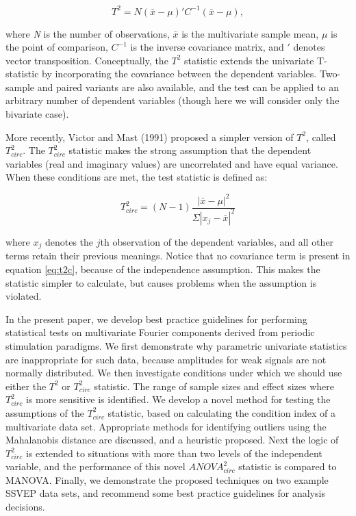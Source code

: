 \documentclass[]{article}
\begin{document}
\begin{equation}
\label{eq:t2eq}
T^2 = N(\bar{x} - \mu)' C^{-1} (\bar{x} - \mu),
\end{equation}

where \emph{N} is the number of observations, \(\bar{x}\) is the multivariate sample mean, \(\mu\) is the point of comparison, \(C^{-1}\) is the inverse covariance matrix, and \('\) denotes vector transposition. Conceptually, the \(T^2\) statistic extends the univariate T-statistic by incorporating the covariance between the dependent variables. Two-sample and paired variants are also available, and the test can be applied to an arbitrary number of dependent variables (though here we will consider only the bivariate case).

More recently, Victor and Mast (1991) proposed a simpler version of \(T^2\), called \(T^2_{circ}\). The \(T^2_{circ}\) statistic makes the strong assumption that the dependent variables (real and imaginary values) are uncorrelated and have equal variance. When these conditions are met, the test statistic is defined as:

\begin{equation}
\label{eq:t2c}
T^2_{circ} = (N-1)\frac{|\bar{x}-\mu|^2}{\Sigma|x_j - \bar{x}|^2}
\end{equation}

where \(x_j\) denotes the \(j\)th observation of the dependent variables, and all other terms retain their previous meanings. Notice that no covariance term is present in equation \eqref{eq:t2c}, because of the independence assumption. This makes the statistic simpler to calculate, but causes problems when the assumption is violated.

In the present paper, we develop best practice guidelines for performing statistical tests on multivariate Fourier components derived from periodic stimulation paradigms. We first demonstrate why parametric univariate statistics are inappropriate for such data, because amplitudes for weak signals are not normally distributed. We then investigate conditions under which we should use either the \(T^2\) or \(T^2_{circ}\) statistic. The range of sample sizes and effect sizes where \(T^2_{circ}\) is more sensitive is identified. We develop a novel method for testing the assumptions of the \(T^2_{circ}\) statistic, based on calculating the condition index of a multivariate data set. Appropriate methods for identifying outliers using the Mahalanobis distance are discussed, and a heuristic proposed. Next the logic of \(T^2_{circ}\) is extended to situations with more than two levels of the independent variable, and the performance of this novel \(ANOVA^2_{circ}\) statistic is compared to MANOVA. Finally, we demonstrate the proposed techniques on two example SSVEP data sets, and recommend some best practice guidelines for analysis decisions.
\end{document}

